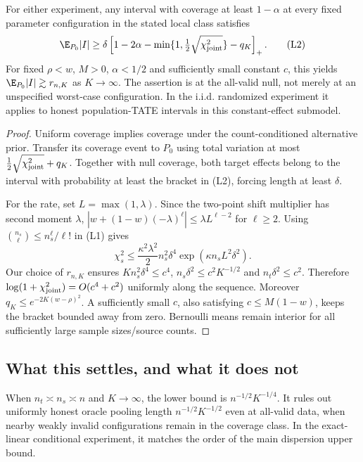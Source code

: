 \begin{theorem}
\label{thm:local-lower}
For either experiment, any interval with coverage at least $1-\alpha$ at
every fixed parameter configuration in the stated local class satisfies
\[
 \E_{P_0}|I|\ge
 \delta\left[1-2\alpha-
    \min\{1,\tfrac12\sqrt{\chi_{\rm joint}^2}\}-q_K\right]_+.
\tag{L2}
\]
For fixed $\rho<w$, $M>0$, $\alpha<1/2$ and sufficiently small constant $c$,
this yields $\E_{P_0}|I|\gtrsim r_{n,K}$ as $K\to\infty$. The assertion is
at the all-valid null, not merely at an unspecified worst-case configuration.
In the i.i.d. randomized experiment it applies to honest population-TATE
intervals in this constant-effect submodel.
\end{theorem}

\begin{proof}
Uniform coverage implies coverage under the count-conditioned alternative
prior. Transfer its coverage event to $P_0$ using total variation at most
$\frac12\sqrt{\chi_{\rm joint}^2}+q_K$. Together with null coverage, both
target effects belong to the interval with probability at least the bracket
in (L2), forcing length at least $\delta$.

For the rate, set $L=\max(1,\lambda)$. Since the two-point shift multiplier
has second moment $\lambda$,
$|w+(1-w)(-\lambda)^\ell|\le\lambda L^{\ell-2}$ for $\ell\ge2$.
Using $\binom{n_s}{\ell}\le n_s^\ell/\ell!$ in (L1) gives
\[
 \chi_s^2\le\frac{\kappa^2\lambda^2}{2}
       n_s^2\delta^4\exp(\kappa n_s L^2\delta^2).
\]
Our choice of $r_{n,K}$ ensures $K n_s^2\delta^4\le c^4$,
$n_s\delta^2\le c^2K^{-1/2}$ and $n_t\delta^2\le c^2$. Therefore
$\log(1+\chi_{\rm joint}^2)=O(c^4+c^2)$ uniformly along the sequence.
Moreover $q_K\le e^{-2K(w-\rho)^2}$. A sufficiently small $c$, also satisfying
$c\le M(1-w)$, keeps the bracket bounded away from zero. Bernoulli means
remain interior for all sufficiently large sample sizes/source counts.
\end{proof}

\subsection{What this settles, and what it does not}

When $n_t\asymp n_s\asymp n$ and $K\to\infty$, the lower bound is
$n^{-1/2}K^{-1/4}$. It rules out uniformly honest oracle pooling length
$n^{-1/2}K^{-1/2}$ even at all-valid data, when nearby weakly invalid
configurations remain in the coverage class. In the exact-linear conditional
experiment, it matches the order of the main dispersion upper bound.

